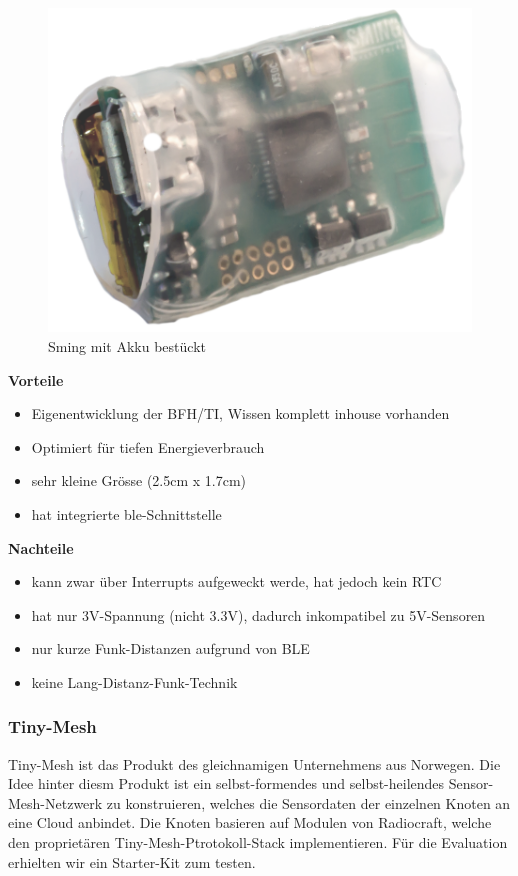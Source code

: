 \begin{figure}[H]
     \centering
        \includegraphics[scale=0.6]{pictures/Sming.png}
    \caption{Sming mit Akku bestückt}
    \label{fig:Sming}
\end{figure}

\textbf{Vorteile}
\begin{itemize}
\item Eigenentwicklung der BFH/TI, Wissen komplett inhouse vorhanden
\item Optimiert für tiefen Energieverbrauch
\item sehr kleine Grösse (2.5cm x 1.7cm)
\item hat integrierte \gls{ble}-Schnittstelle
\end{itemize}
\textbf{Nachteile}
\begin{itemize}
\item kann zwar über Interrupts aufgeweckt werde, hat jedoch kein RTC
\item hat nur 3V-Spannung (nicht 3.3V), dadurch inkompatibel zu 5V-Sensoren
\item nur kurze Funk-Distanzen aufgrund von BLE
\item keine Lang-Distanz-Funk-Technik
\end{itemize}

\newpage

\subsubsection*{Tiny-Mesh}
Tiny-Mesh ist das Produkt des gleichnamigen Unternehmens aus Norwegen. Die Idee hinter diesm Produkt ist ein selbst-formendes und selbst-heilendes Sensor-Mesh-Netzwerk zu konstruieren, welches die Sensordaten der einzelnen Knoten an eine Cloud anbindet. Die Knoten basieren auf Modulen von Radiocraft, welche den proprietären Tiny-Mesh-Ptrotokoll-Stack implementieren. Für die Evaluation erhielten wir ein Starter-Kit zum testen.

